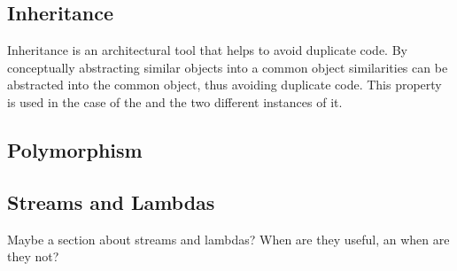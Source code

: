\subsection{Inheritance} 
Inheritance is an architectural tool that helps to avoid duplicate code. By conceptually abstracting similar objects into a common object similarities can be abstracted into the common object, thus avoiding duplicate code. This property is used in the case of the  and the two different instances of it.

\subsection{Polymorphism} 

\subsection{Streams and Lambdas}
Maybe a section about streams and lambdas? When are they useful, an when are they not?


 
